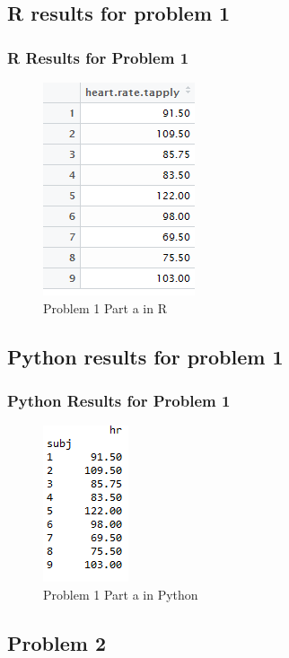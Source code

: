 \documentclass{beamer}
\begin{document}
\subsection{R results for problem 1}

\begin{frame}
\frametitle{R Results for Problem 1}
\begin{figure}
\includegraphics[scale=0.9]{displayP1R.png}
\caption{\label{fig:your-figure}Problem 1 Part a in R} 
\end{figure} 
\end{frame}

\subsection{Python results for problem 1}

\begin{frame}
\frametitle{Python Results for Problem 1}
\begin{figure}
\includegraphics[scale=0.9]{displayP1Python.png}
\caption{\label{fig:your-figure}Problem 1 Part a in Python} 
\end{figure} 
\end{frame}



\subsection{Problem 2}
\end{document}
